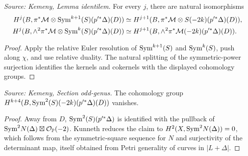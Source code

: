 \begin{lemma}
  \label{lem:kemeny_odd_identilem}
  \textit{Source: Kemeny, Lemma identilem.}
  For every \(j\), there are natural isomorphisms
  \[
  \begin{aligned}
    H^j(B,\pi^*\mathcal M\otimes\mathrm{Sym}^{k+1}(S)(p'^*\Delta)(D))
      &\simeq H^{j+1}(B,\pi^*\mathcal M\otimes S(-2k)(p'^*\Delta)(D)),\\
    H^j(B,\wedge^2\pi^*\mathcal M\otimes\mathrm{Sym}^k(S)(p'^*\Delta)(D))
      &\simeq H^{j+1}(B,\wedge^2\pi^*\mathcal M(-2k)(p'^*\Delta)(D)).
  \end{aligned}
  \]
\end{lemma}
\begin{proof}
  Apply the relative Euler resolution of \(\mathrm{Sym}^{k+1}(S)\) and \(\mathrm{Sym}^k(S)\),
  push along \(\chi\), and use relative duality.  The natural splitting of the
  symmetric-power surjection identifies the kernels and cokernels with the
  displayed cohomology groups.
\end{proof}

\begin{lemma}
  \label{lem:kemeny_odd_sym2S_vanishing}
  \textit{Source: Kemeny, Section odd-genus.}
  The cohomology group
  \(H^{k+4}(B,\mathrm{Sym}^2(S)(-2k)(p'^*\Delta)(D))\) vanishes.
\end{lemma}
\begin{proof}
  Away from \(D\), \(\mathrm{Sym}^2(S)(p'^*\Delta)\) is identified with the pullback of
  \(\mathrm{Sym}^2N(\Delta)\boxtimes\mathcal{O}_{\mathbb{P}}(-2)\).  Kunneth reduces the claim to
  \(H^2(X,\mathrm{Sym}^2N(\Delta))=0\), which follows from the symmetric-square sequence
  for \(N\) and surjectivity of the determinant map, itself obtained from Petri
  generality of curves in \(|L+\Delta|\).
\end{proof}

